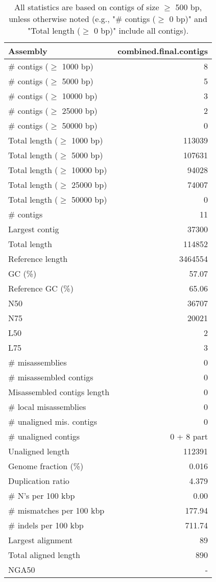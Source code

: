 \documentclass[12pt,a4paper]{article}
\begin{document}
\begin{table}[ht]
\begin{center}
\caption{All statistics are based on contigs of size $\geq$ 500 bp, unless otherwise noted (e.g., "\# contigs ($\geq$ 0 bp)" and "Total length ($\geq$ 0 bp)" include all contigs).}
\begin{tabular}{|l*{1}{|r}|}
\hline
Assembly & combined.final.contigs \\ \hline
\# contigs ($\geq$ 1000 bp) & 8 \\ \hline
\# contigs ($\geq$ 5000 bp) & 5 \\ \hline
\# contigs ($\geq$ 10000 bp) & 3 \\ \hline
\# contigs ($\geq$ 25000 bp) & 2 \\ \hline
\# contigs ($\geq$ 50000 bp) & 0 \\ \hline
Total length ($\geq$ 1000 bp) & 113039 \\ \hline
Total length ($\geq$ 5000 bp) & 107631 \\ \hline
Total length ($\geq$ 10000 bp) & 94028 \\ \hline
Total length ($\geq$ 25000 bp) & 74007 \\ \hline
Total length ($\geq$ 50000 bp) & 0 \\ \hline
\# contigs & 11 \\ \hline
Largest contig & 37300 \\ \hline
Total length & 114852 \\ \hline
Reference length & 3464554 \\ \hline
GC (\%) & 57.07 \\ \hline
Reference GC (\%) & 65.06 \\ \hline
N50 & 36707 \\ \hline
N75 & 20021 \\ \hline
L50 & 2 \\ \hline
L75 & 3 \\ \hline
\# misassemblies & 0 \\ \hline
\# misassembled contigs & 0 \\ \hline
Misassembled contigs length & 0 \\ \hline
\# local misassemblies & 0 \\ \hline
\# unaligned mis. contigs & 0 \\ \hline
\# unaligned contigs & 0 + 8 part \\ \hline
Unaligned length & 112391 \\ \hline
Genome fraction (\%) & 0.016 \\ \hline
Duplication ratio & 4.379 \\ \hline
\# N's per 100 kbp & 0.00 \\ \hline
\# mismatches per 100 kbp & 177.94 \\ \hline
\# indels per 100 kbp & 711.74 \\ \hline
Largest alignment & 89 \\ \hline
Total aligned length & 890 \\ \hline
NGA50 & - \\ \hline
\end{tabular}
\end{center}
\end{table}
\end{document}
